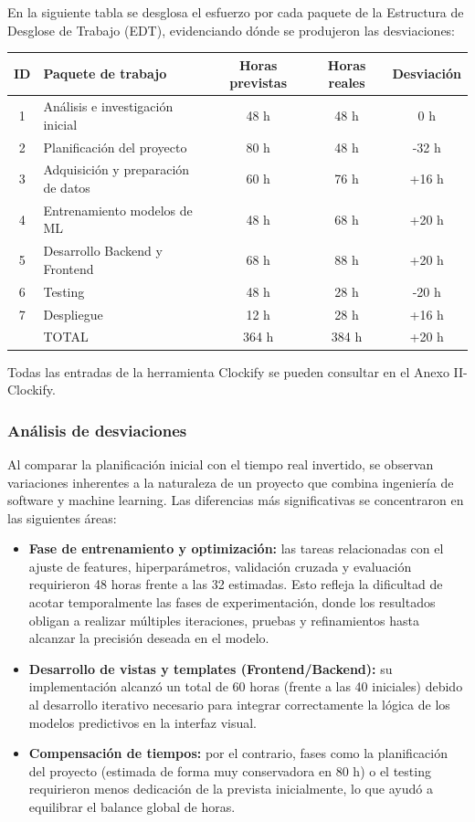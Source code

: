 En la siguiente tabla se desglosa el esfuerzo por cada paquete de la Estructura de Desglose de Trabajo (EDT), evidenciando dónde se produjeron las desviaciones:

\begin{center}
\small
\begin{tabularx}{\textwidth}{cXccc}
\toprule
\textbf{ID} & \textbf{Paquete de trabajo} & \textbf{Horas previstas} & \textbf{Horas reales} & \textbf{Desviación} \\
\midrule
1 & Análisis e investigación inicial & 48 h & 48 h & 0 h \\
2 & Planificación del proyecto & 80 h & 48 h & -32 h \\
3 & Adquisición y preparación de datos & 60 h & 76 h & +16 h \\
4 & Entrenamiento modelos de ML & 48 h & 68 h & +20 h \\
5 & Desarrollo Backend y Frontend & 68 h & 88 h & +20 h \\
6 & Testing & 48 h & 28 h & -20 h \\
7 & Despliegue & 12 h & 28 h & +16 h \\
\midrule
 & TOTAL & 364 h & 384 h & +20 h \\
\bottomrule
\end{tabularx}
\end{center}

Todas las entradas de la herramienta Clockify se pueden consultar en el Anexo II-Clockify.

\subsubsection{Análisis de desviaciones}

Al comparar la planificación inicial con el tiempo real invertido, se observan variaciones inherentes a la naturaleza de un proyecto que combina ingeniería de software y machine learning. Las diferencias más significativas se concentraron en las siguientes áreas:

\begin{itemize}
    \item \textbf{Fase de entrenamiento y optimización:} las tareas relacionadas con el ajuste de features, hiperparámetros, validación cruzada y evaluación requirieron 48 horas frente a las 32 estimadas. Esto refleja la dificultad de acotar temporalmente las fases de experimentación, donde los resultados obligan a realizar múltiples iteraciones, pruebas y refinamientos hasta alcanzar la precisión deseada en el modelo.
    \item \textbf{Desarrollo de vistas y templates (Frontend/Backend):} su implementación alcanzó un total de 60 horas (frente a las 40 iniciales) debido al desarrollo iterativo necesario para integrar correctamente la lógica de los modelos predictivos en la interfaz visual.
    \item \textbf{Compensación de tiempos:} por el contrario, fases como la planificación del proyecto (estimada de forma muy conservadora en 80 h) o el testing requirieron menos dedicación de la prevista inicialmente, lo que ayudó a equilibrar el balance global de horas.
\end{itemize}

